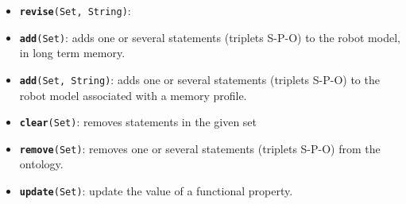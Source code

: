 \begin{itemize}
    \item {\tt {\bf revise}(Set, String)}: 

    \item {\tt {\bf add}(Set)}: adds one or several statements (triplets S-P-O)
    to the robot model, in long term memory.

    \item {\tt {\bf add}(Set, String)}: adds one or several statements
    (triplets S-P-O) to the robot model associated with a memory profile.

    \item {\tt {\bf clear}(Set)}: removes statements in the given set

    \item {\tt {\bf remove}(Set)}: removes one or several statements (triplets
    S-P-O) from the ontology.

    \item {\tt {\bf update}(Set)}: update the value of a functional property.

\end{itemize}

